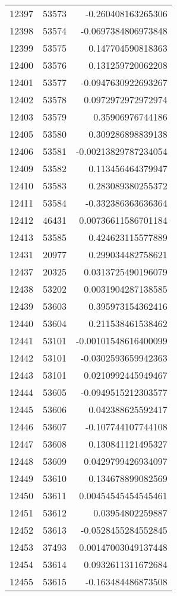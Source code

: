 \begin{tabular}{r | r | r}
12397 & 53573 & -0.260408163265306 \\
12398 & 53574 & -0.0697384806973848 \\
12399 & 53575 & 0.147704590818363 \\
12400 & 53576 & 0.131259720062208 \\
12401 & 53577 & -0.0947630922693267 \\
12402 & 53578 & 0.0972972972972974 \\
12403 & 53579 & 0.35906976744186 \\
12405 & 53580 & 0.309286898839138 \\
12406 & 53581 & -0.00213829787234054 \\
12409 & 53582 & 0.113456464379947 \\
12410 & 53583 & 0.283089380255372 \\
12411 & 53584 & -0.332386363636364 \\
12412 & 46431 & 0.00736611586701184 \\
12413 & 53585 & 0.424623115577889 \\
12431 & 20977 & 0.299034482758621 \\
12437 & 20325 & 0.0313725490196079 \\
12438 & 53202 & 0.0031904287138585 \\
12439 & 53603 & 0.395973154362416 \\
12440 & 53604 & 0.211538461538462 \\
12441 & 53101 & -0.00101548616400099 \\
12442 & 53101 & -0.0302593659942363 \\
12443 & 53101 & 0.0210992445949467 \\
12444 & 53605 & -0.0949515212303577 \\
12445 & 53606 & 0.042388625592417 \\
12446 & 53607 & -0.107744107744108 \\
12447 & 53608 & 0.130841121495327 \\
12448 & 53609 & 0.0429799426934097 \\
12449 & 53610 & 0.134678899082569 \\
12450 & 53611 & 0.00454545454545461 \\
12451 & 53612 & 0.03954802259887 \\
12452 & 53613 & -0.0528455284552845 \\
12453 & 37493 & 0.00147003049137448 \\
12454 & 53614 & 0.0932611311672684 \\
12455 & 53615 & -0.163484486873508 \\

\end{tabular}
